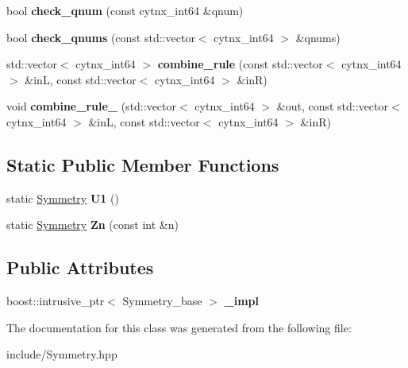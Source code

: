 \begin{DoxyCompactItemize}
\item 
\mbox{\label{classcytnx_1_1Symmetry_a066741cabfe04df9e9e2782f047188b0}} 
bool {\bfseries check\+\_\+qnum} (const cytnx\+\_\+int64 \&qnum)
\item 
\mbox{\label{classcytnx_1_1Symmetry_a38c1572a027e289430434b56324e2ead}} 
bool {\bfseries check\+\_\+qnums} (const std\+::vector$<$ cytnx\+\_\+int64 $>$ \&qnums)
\item 
\mbox{\label{classcytnx_1_1Symmetry_a9107f92e1fcda52d3f9391820e1111fa}} 
std\+::vector$<$ cytnx\+\_\+int64 $>$ {\bfseries combine\+\_\+rule} (const std\+::vector$<$ cytnx\+\_\+int64 $>$ \&inL, const std\+::vector$<$ cytnx\+\_\+int64 $>$ \&inR)
\item 
\mbox{\label{classcytnx_1_1Symmetry_a7a2e6c3f679b5e6774f269b78c8239e8}} 
void {\bfseries combine\+\_\+rule\+\_\+} (std\+::vector$<$ cytnx\+\_\+int64 $>$ \&out, const std\+::vector$<$ cytnx\+\_\+int64 $>$ \&inL, const std\+::vector$<$ cytnx\+\_\+int64 $>$ \&inR)
\end{DoxyCompactItemize}
\subsection*{Static Public Member Functions}
\begin{DoxyCompactItemize}
\item 
\mbox{\label{classcytnx_1_1Symmetry_a9218fd66fc9cca64cd3d792e0019592a}} 
static \hyperlink{classcytnx_1_1Symmetry}{Symmetry} {\bfseries U1} ()
\item 
\mbox{\label{classcytnx_1_1Symmetry_a066083aa705f8fc749b3bbb606f89359}} 
static \hyperlink{classcytnx_1_1Symmetry}{Symmetry} {\bfseries Zn} (const int \&n)
\end{DoxyCompactItemize}
\subsection*{Public Attributes}
\begin{DoxyCompactItemize}
\item 
\mbox{\label{classcytnx_1_1Symmetry_a8306cca4c4faae52a9592e5551f80ac0}} 
boost\+::intrusive\+\_\+ptr$<$ Symmetry\+\_\+base $>$ {\bfseries \+\_\+impl}
\end{DoxyCompactItemize}


The documentation for this class was generated from the following file\+:\begin{DoxyCompactItemize}
\item 
include/Symmetry.\+hpp\end{DoxyCompactItemize}
